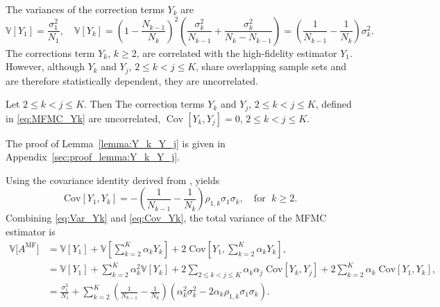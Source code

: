 The variances of the correction terms $Y_k$ are
\begin{equation}\label{eq:Var_Yk}
    \mathbb{V}\left[Y_1\right] = \frac{\sigma_1^2}{N_1}, \quad \mathbb{V}\left[Y_k\right] = \left(1-\frac{N_{k-1}}{N_k}\right)^2\left(\frac{\sigma_k^2}{N_{k-1}}+\frac{\sigma_k^2}{N_k-N_{k-1}}\right) = \left(\frac{1}{N_{k-1}} - \frac{1}{N_k}\right)\sigma_k^2.
\end{equation}
The corrections term $Y_k$, $k\ge 2$, are correlated with the high-fidelity estimator $Y_1$.
However, although $Y_k$ and $Y_j$, $2\le k<j \le K$, share overlapping sample sets and are therefore statistically dependent, they are uncorrelated.

\begin{lemma}\label{lemma:Y_k_Y_j}
Let $2\le k<j\le K$. Then 
  The correction terms $Y_k$ and $Y_j$, $2\le k<j \le K$, defined in \eqref{eq:MFMC_Yk} are uncorrelated,
  $\operatorname{Cov} [Y_k,Y_j ]=0$,  $2\le k<j \le K$.
\end{lemma}
The proof of Lemma~\ref{lemma:Y_k_Y_j} is given in Appendix~\ref{sec:proof_lemma:Y_k_Y_j}.

 Using the covariance identity derived from \cite[Lemma~3.2]{PeWiGu:2016}, yields
%
\begin{equation}\label{eq:Cov_Yk}
\text{Cov}[Y_1,Y_k] = - \left(\frac{1}{N_{k-1}} - \frac{1}{N_k}\right)\rho_{1,k}\sigma_1\sigma_k, \quad \text{for } \; k\ge 2.
\end{equation}
%
Combining \eqref{eq:Var_Yk} and \eqref{eq:Cov_Yk}, the total variance of the MFMC estimator is 
%
\begin{align}
    \nonumber
    \mathbb{V}\big[A^{\text{MF}}\big] &= \mathbb{V}\left[Y_1\right] + \mathbb{V}\left[\sum_{k=2}^K \alpha_kY_k\right]+2\;\text{Cov}\left[Y_1,\sum_{k=2}^K \alpha_k Y_k \right],\\
    \nonumber
    &=\mathbb{V}\left[Y_1\right] + \sum_{k=2}^K \alpha_k^2 \mathbb{V}\left[Y_k\right]+2\sum_{2\le k<j\le K} \alpha_k\alpha_j\; \text{Cov}[Y_k,Y_j] +2\sum_{k=2}^K \alpha_k\;\text{Cov}\left[Y_1, Y_k\right],\\
    \label{eq:MFMC_variance}
    &=\frac{\sigma_1^2}{N_1} + \sum_{k=2}^K \left(\frac{1}{N_{k-1}} - \frac{1}{N_k}\right)\left(\alpha_k^2\sigma_k^2 - 2\alpha_k\rho_{1,k}\sigma_1\sigma_k\right).
\end{align}
%


